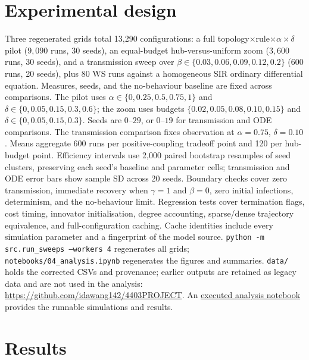 \documentclass[11pt,a4paper]{article}
\begin{document}
\section{Experimental design}
Three regenerated grids total 13,290 configurations: a full
topology$\times$rule$\times\alpha\times\delta$ pilot ($9{,}090$ runs, 30
seeds), an equal-budget hub-versus-uniform zoom ($3{,}600$ runs, 30 seeds),
and a transmission sweep over $\beta \in \{0.03,0.06,0.09,0.12,0.2\}$
($600$ runs, 20 seeds), plus 80 WS runs against a homogeneous SIR ordinary
differential equation. Measures, seeds, and the no-behaviour baseline are
fixed across comparisons. The pilot uses
$\alpha\in\{0,0.25,0.5,0.75,1\}$ and
$\delta\in\{0,0.05,0.15,0.3,0.6\}$; the zoom uses budgets
$\{0.02,0.05,0.08,0.10,0.15\}$ and $\delta\in\{0,0.05,0.15,0.3\}$.
Seeds are $0$--$29$, or $0$--$19$ for transmission and ODE comparisons.
The transmission comparison fixes observation at $\alpha=0.75$, $\delta=0.10$.
Means aggregate 600 runs per positive-coupling tradeoff point and 120 per
hub-budget point. Efficiency intervals use 2,000 paired bootstrap resamples
of seed clusters, preserving each seed's baseline and parameter cells;
transmission and ODE error bars show sample SD across 20 seeds.
Boundary checks cover zero transmission, immediate recovery when
$\gamma=1$ and $\beta=0$, zero initial infections, determinism, and the
no-behaviour limit. Regression tests cover termination flags, cost timing,
innovator initialisation, degree accounting, sparse/dense trajectory
equivalence, and full-configuration caching. Cache identities include every
simulation parameter and a fingerprint of the model source.
\texttt{python -m src.run\_sweeps --workers 4} regenerates all grids;
\texttt{notebooks/04\_analysis.ipynb} regenerates the figures and summaries.
\texttt{data/} holds the corrected CSVs and provenance; earlier outputs are
retained as legacy data and are not used in the analysis:
\url{https://github.com/idawang142/4403PROJECT}.
An \href{https://github.com/idawang142/4403PROJECT/blob/main/notebooks/04_analysis.ipynb}{executed analysis notebook} provides the runnable simulations and results.

\section{Results}
\end{document}
